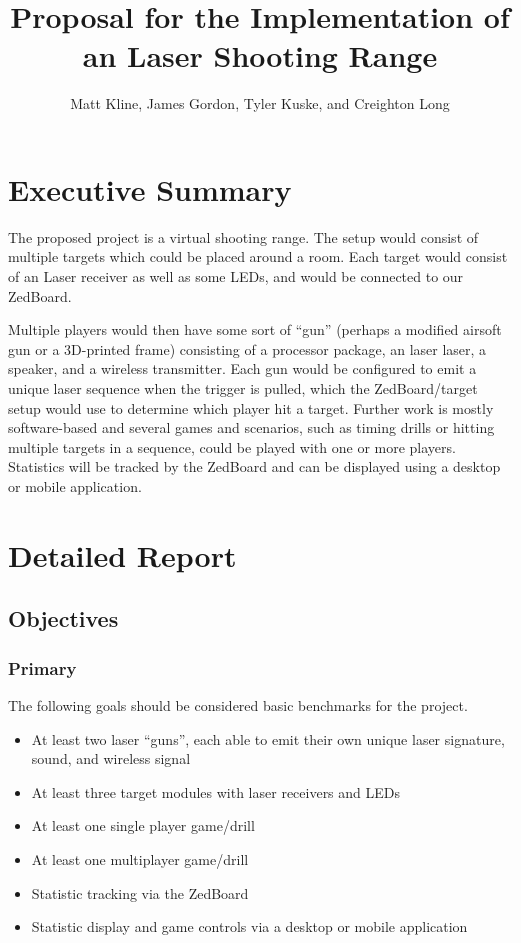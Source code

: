 \documentclass{article}
\begin{document}
\title{Proposal for the Implementation of an Laser Shooting Range}
\author{Matt Kline, James Gordon, Tyler Kuske, and Creighton Long}
\maketitle
\tableofcontents
\newpage

\section{Executive Summary}

The proposed project is a virtual shooting range.
The setup would consist of multiple targets which could be placed around a room.
Each target would consist of an Laser receiver as well as some LEDs, and would be connected to our ZedBoard.

Multiple players would then have some sort of ``gun'' (perhaps a modified airsoft gun or a 3D-printed frame)
consisting of a processor package, an laser laser, a speaker, and a wireless transmitter.
Each gun would be configured to emit a unique laser sequence when the trigger is pulled,
which the ZedBoard/target setup would use to determine which player hit a target.
Further work is mostly software-based and several games and scenarios,
such as timing drills or hitting multiple targets in a sequence, could be played with one or more players.
Statistics will be tracked by the ZedBoard and can be displayed using a desktop or mobile application.

\newpage

\section{Detailed Report}

\subsection{Objectives}

\subsubsection{Primary}

The following goals should be considered basic benchmarks for the project.

\begin{itemize}
\item At least two laser ``guns'', each able to emit their own unique laser signature, sound, and wireless signal
\item At least three target modules with laser receivers and LEDs
\item At least one single player game/drill
\item At least one multiplayer game/drill
\item Statistic tracking via the ZedBoard
\item Statistic display and game controls via a desktop or mobile application
\end{itemize}
\end{document}
